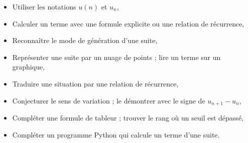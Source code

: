 \documentclass[12pt]{article}
\title{
  \vspace{0em}
  \centering
  \tcbset{colframe=BlackSav,colback=GrayBG}
  \tcbox[tikznode]{
    Chapitre 4 \\ Généralités sur les suites
  }
}
\author{}
\date{}
\theoremstyle{break}
\theoremstyle{inline}
\begin{document}
\maketitle
\thispagestyle{firststyle}

\tableofcontents

\vspace{1.5cm plus 1fill}
\begin{savoir}{}{}
\begin{itemize}[label=--]
  \item Utiliser les notations $u(n)$ et $u_n$,
  \item Calculer un terme avec une formule explicite ou une relation de récurrence,
  \item Reconnaître le mode de génération d'une suite,
  \item Représenter une suite par un nuage de points ; lire un terme sur un graphique,
  \item Traduire une situation par une relation de récurrence,
  \item Conjecturer le sens de variation ; le démontrer avec le signe de $u_{n+1} - u_n$,
  \item Compléter une formule de tableur ; trouver le rang où un seuil est dépassé,
  \item Compléter un programme Python qui calcule un terme d'une suite.
\end{itemize}
\end{savoir}

\newsavebox{\hidebox}
\end{document}

